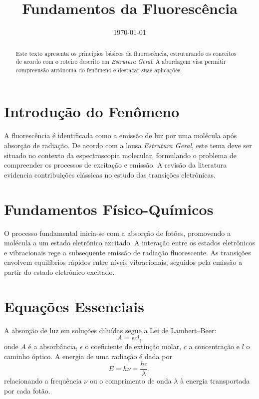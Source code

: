 \documentclass[11pt]{article}
\title{Fundamentos da Fluoresc\^encia}
\author{}
\date{\today}
\begin{document}
\maketitle

\begin{abstract}
Este texto apresenta os princ\'ipios b\'asicos da fluoresc\^encia, estruturando os conceitos de acordo com o roteiro descrito em \textit{Estrutura Geral}. A abordagem visa permitir compreens\~ao aut\^onoma do fen\^omeno e destacar suas aplica\c{c}\~oes.
\end{abstract}

\section{Introdu\c{c}\~ao do Fen\^omeno}
A fluoresc\^encia \'e identificada como a emiss\~ao de luz por uma mol\'ecula ap\'os absor\c{c}\~ao de radia\c{c}\~ao. De acordo com a lousa \textit{Estrutura Geral}, este tema deve ser situado no contexto da espectroscopia molecular, formulando o problema de compreender os processos de excita\c{c}\~ao e emiss\~ao. A revis\~ao da literatura evidencia contribui\c{c}\~oes cl\'assicas no estudo das transi\c{c}\~oes eletr\^onicas.

\section{Fundamentos F\'isico-Qu\'imicos}
O processo fundamental inicia-se com a absor\c{c}\~ao de fot\~oes, promovendo a mol\'ecula a um estado eletr\^onico excitado. A intera\c{c}\~ao entre os estados eletr\^onicos e vibracionais rege a subsequente emiss\~ao de radia\c{c}\~ao fluorescente. As transi\c{c}\~oes envolvem equil\'ibrios r\'apidos entre n\'iveis vibracionais, seguidos pela emiss\~ao a partir do estado eletr\^onico excitado.

\section{Equa\c{c}\~oes Essenciais}
A absor\c{c}\~ao de luz em solu\c{c}\~oes dilu\'idas segue a Lei de Lambert--Beer:
\begin{equation}
A = \epsilon c l,
\end{equation}
onde $A$ \'e a absorb\^ancia, $\epsilon$ o coeficiente de extin\c{c}\~ao molar, $c$ a concentra\c{c}\~ao e $l$ o caminho \'optico. A energia de uma radia\c{c}\~ao \'e dada por
\begin{equation}
E = h \nu = \frac{hc}{\lambda},
\end{equation}
relacionando a frequ\^encia $\nu$ ou o comprimento de onda $\lambda$ \`a energia transportada por cada fot\~ao.
\end{document}
